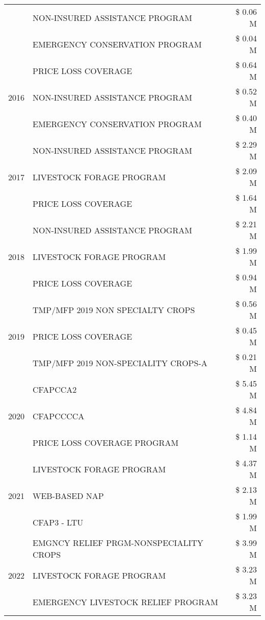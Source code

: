 \begin{tabular}{llr}
 & NON-INSURED ASSISTANCE PROGRAM & \$ 0.06 M \\
 & EMERGENCY CONSERVATION PROGRAM & \$ 0.04 M \\
\cline{1-3}
\multirow[t]{3}{*}{2016} & PRICE LOSS COVERAGE & \$ 0.64 M \\
 & NON-INSURED ASSISTANCE PROGRAM & \$ 0.52 M \\
 & EMERGENCY CONSERVATION PROGRAM & \$ 0.40 M \\
\cline{1-3}
\multirow[t]{3}{*}{2017} & NON-INSURED ASSISTANCE PROGRAM & \$ 2.29 M \\
 & LIVESTOCK FORAGE PROGRAM & \$ 2.09 M \\
 & PRICE LOSS COVERAGE & \$ 1.64 M \\
\cline{1-3}
\multirow[t]{3}{*}{2018} & NON-INSURED ASSISTANCE PROGRAM & \$ 2.21 M \\
 & LIVESTOCK FORAGE PROGRAM & \$ 1.99 M \\
 & PRICE LOSS COVERAGE & \$ 0.94 M \\
\cline{1-3}
\multirow[t]{3}{*}{2019} & TMP/MFP 2019 NON SPECIALTY CROPS & \$ 0.56 M \\
 & PRICE LOSS COVERAGE & \$ 0.45 M \\
 & TMP/MFP 2019 NON-SPECIALITY CROPS-A & \$ 0.21 M \\
\cline{1-3}
\multirow[t]{3}{*}{2020} & CFAPCCA2 & \$ 5.45 M \\
 & CFAPCCCCA & \$ 4.84 M \\
 & PRICE LOSS COVERAGE PROGRAM & \$ 1.14 M \\
\cline{1-3}
\multirow[t]{3}{*}{2021} & LIVESTOCK FORAGE PROGRAM & \$ 4.37 M \\
 & WEB-BASED NAP & \$ 2.13 M \\
 & CFAP3 - LTU & \$ 1.99 M \\
\cline{1-3}
\multirow[t]{3}{*}{2022} & EMGNCY RELIEF PRGM-NONSPECIALITY CROPS & \$ 3.99 M \\
 & LIVESTOCK FORAGE PROGRAM & \$ 3.23 M \\
 & EMERGENCY LIVESTOCK RELIEF PROGRAM & \$ 3.23 M \\
\cline{1-3}
\bottomrule
\end{tabular}
